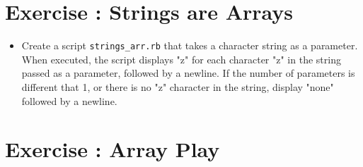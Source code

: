 \documentclass{42-en}
\begin{document}


\chapter{Exercise \exercicenumber: Strings are Arrays}

\exnumber{\exercicenumber}

\makeheaderfiles

\begin{itemize}

\item Create a script \texttt{strings_arr.rb} that takes a character string as a parameter. When executed, the script displays "z" for each character "z" in the string passed as a parameter, followed by a newline.
If the number of parameters is different that 1, or there is no "z" character in the string, display "none" followed by a newline.


\end{itemize}



\chapter{Exercise \exercicenumber: Array Play}
\end{document}
